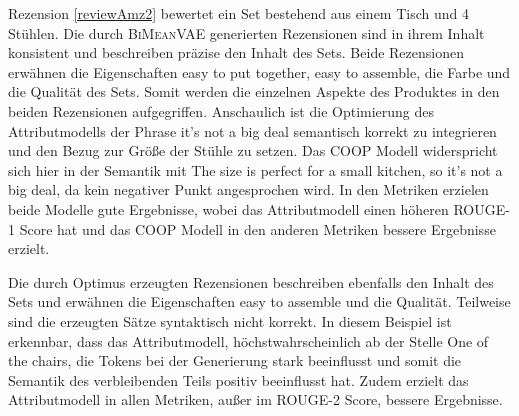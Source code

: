 Rezension \ref{reviewAmz2} bewertet ein Set bestehend aus einem Tisch und 4 Stühlen.
Die durch \textsc{BiMeanVAE} generierten Rezensionen sind in ihrem Inhalt konsistent und beschreiben präzise den Inhalt des Sets.
Beide Rezensionen erwähnen die Eigenschaften \glqq{}easy to put together\grqq{}, \glqq{}easy to assemble\grqq{}, die Farbe und die Qualität des Sets.
Somit werden die einzelnen Aspekte des Produktes in den beiden Rezensionen aufgegriffen.
Anschaulich ist die Optimierung des Attributmodells der Phrase \glqq{}it's not a big deal\grqq{} semantisch korrekt zu integrieren und den Bezug zur Größe der Stühle zu setzen.
Das COOP Modell widerspricht sich hier in der Semantik mit \glqq{}The size is perfect for a small kitchen, so it's not a big deal\grqq{}, da kein negativer Punkt angesprochen wird.
In den Metriken erzielen beide Modelle gute Ergebnisse, wobei das Attributmodell einen höheren ROUGE-1 Score hat und das COOP Modell in den anderen Metriken bessere Ergebnisse erzielt.

Die durch Optimus erzeugten Rezensionen beschreiben ebenfalls den Inhalt des Sets und erwähnen die Eigenschaften \glqq{}easy to assemble\grqq{} und die Qualität.
Teilweise sind die erzeugten Sätze syntaktisch nicht korrekt. 
In diesem Beispiel ist erkennbar, dass das Attributmodell, höchstwahrscheinlich ab der Stelle \glqq{}One of the chairs\grqq{}, die Tokens bei der Generierung stark beeinflusst und somit die Semantik des verbleibenden Teils positiv beeinflusst hat.
Zudem erzielt das Attributmodell in allen Metriken, außer im ROUGE-2 Score, bessere Ergebnisse.

